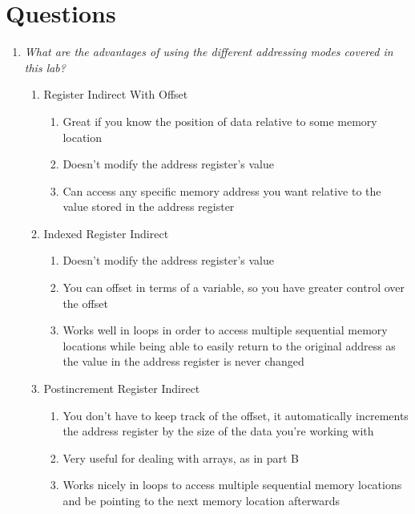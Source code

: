 \documentclass[letterpaper]{article}
\begin{document}
\section{Questions}
  \begin{enumerate}
    \item \textit{What are the advantages of using the different addressing modes covered in this lab?}
          \begin{enumerate}
            \item Register Indirect With Offset
              \begin{enumerate}
                \item Great if you know the position of data relative to some memory location
                \item Doesn't modify the address register's value
                \item Can access any specific memory address you want relative to the value
                      stored in the address register
              \end{enumerate}
            \item Indexed Register Indirect
            \begin{enumerate}
              \item Doesn't modify the address register's value
              \item You can offset in terms of a variable, so you have greater control over the offset
              \item Works well in loops in order to access multiple sequential memory locations
                    while being able to easily return to the original address as the value in the
                    address register is never changed
            \end{enumerate}
            \item Postincrement Register Indirect
            \begin{enumerate}
              \item You don't have to keep track of the offset, it automatically
                    increments the address register by the size of the data
                    you're working with
              \item Very useful for dealing with arrays, as in part B
              \item Works nicely in loops to access multiple sequential memory
                    locations and be pointing to the next memory location afterwards
            \end{enumerate}
          \end{enumerate}


\end{enumerate}
\end{document}
